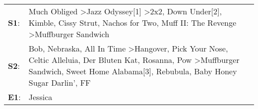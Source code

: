 \begin{supertabular}{p{0.03\textwidth}p{0.92\textwidth}}
 \textbf{S1}:  &                                                                                                                                                                                   Much Obliged\textsuperscript{} \textgreater \enspace Jazz Odyssey[1]\textsuperscript{} \textgreater \enspace 2x2\textsuperscript{}, \enspace Down Under[2]\textsuperscript{}, \enspace Kimble\textsuperscript{}, \enspace Cissy Strut\textsuperscript{}, \enspace Nachos for Two\textsuperscript{}, \enspace Muff II: The Revenge\textsuperscript{} \textgreater \enspace Muffburger Sandwich\textsuperscript{}  \enspace  \\
 \textbf{S2}:  &  Bob\textsuperscript{}, \enspace Nebraska\textsuperscript{}, \enspace All In Time\textsuperscript{} \textgreater \enspace Hangover\textsuperscript{}, \enspace Pick Your Nose\textsuperscript{}, \enspace Celtic Alleluia\textsuperscript{}, \enspace Der Bluten Kat\textsuperscript{}, \enspace Rosanna\textsuperscript{}, \enspace Pow\textsuperscript{} \textgreater \enspace Muffburger Sandwich\textsuperscript{}, \enspace Sweet Home Alabama[3]\textsuperscript{}, \enspace Rebubula\textsuperscript{}, \enspace Baby Honey Sugar Darlin'\textsuperscript{}, \enspace FF\textsuperscript{}  \enspace  \\
 \textbf{E1}:  &                                                                                                                                                                                                                                                                                                                                                                                                                                                                                                                                                                         Jessica\textsuperscript{}  \enspace  \\
\end{supertabular}
